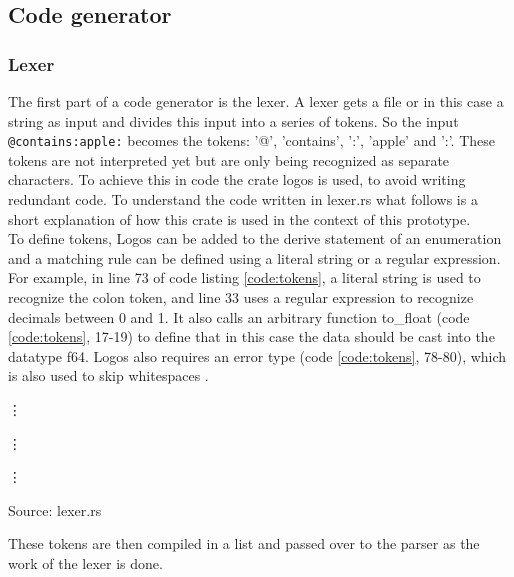 \subsection{Code generator}
\subsubsection{Lexer}
The first part of a code generator is the lexer. A lexer gets a file or in this case a string as input and divides this input into a series of tokens. So the input \lstinline[language=Fulltext-Search]$@contains:apple:$ becomes the tokens: '@', 'contains', ':', 'apple' and ':'. These tokens are not interpreted yet but are only being recognized as separate characters. To achieve this in code the crate logos is used, to avoid writing redundant code. To understand the code written in lexer.rs what follows is a short explanation of how this crate is used in the context of this prototype.\\
To define tokens, Logos can be added to the derive statement of an enumeration and a matching rule can be defined using a literal string or a regular expression. For example, in line 73 of code listing \ref{code:tokens}, a literal string is used to recognize the colon token, and line 33 uses a regular expression to recognize decimals between 0 and 1. It also calls an arbitrary function to\_float (code \ref{code:tokens}, 17-19) to define that in this case the data should be cast into the datatype f64. Logos also requires an error type (code \ref{code:tokens}, 78-80), which is also used to skip whitespaces \parencite[cf.][n.p.]{hirsz_logos_2022}.
\begin{codeenv}
    \label{code:tokens}
    
    \vdots
    
    \vdots
    
    \vdots
    
    \centerline{Source: lexer.rs}
\end{codeenv}
These tokens are then compiled in a list and passed over to the parser as the work of the lexer is done.
